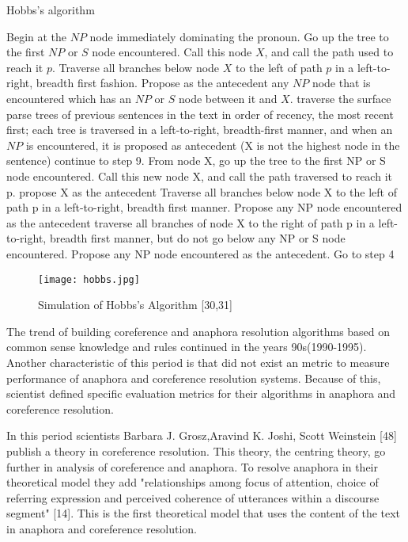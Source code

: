 \newpage
\begin{algorithm}[H]
\caption{Hobbs's algorithm}\label{alg:Hobbs}
\begin{algorithmic}[1]
\State Begin at the $NP$ node immediately dominating the pronoun.
\State Go up the tree to the first $NP$ or $S$ node encountered. Call this node $X$, and call the path used to reach it $p$.
\State Traverse all branches below node $X$ to the left of path $p$ in a left-to-right, breadth first fashion. Propose as the antecedent any $NP$ node that is encountered which has an $NP$ or $S$ node between it and $X$.
	\State traverse the surface parse trees of previous sentences in the text in order of recency, the most recent first; each tree is traversed in a left-to-right, breadth-first manner, and when an $NP$ is encountered, it is proposed as antecedent
\Else
	\State (X is not the highest node in the sentence) continue to step 9.
\EndIf
\State From node X, go up the tree to the first NP or S node encountered. Call this new node X, and call the path traversed to reach it p.
     \State propose X as the antecedent
\EndIf
\State Traverse all branches below node X to the left of path p in a left-to-right, breadth first manner. Propose any NP node encountered as the antecedent
    \State traverse all branches of node X to the right of path p in a left-to-right, breadth first manner, but do not go below any NP or S node encountered.
    \State Propose any NP node encountered as the antecedent.
\EndIf
\State Go to step 4
\end{algorithmic}
\end{algorithm}

\begin{figure}[h]
	\texttt{[image: hobbs.jpg]} 
 	\caption{Simulation of Hobbs's Algorithm [30,31] }
	\label{Figure 5}
\end{figure}

The trend of building coreference and anaphora resolution algorithms based on common sense knowledge and rules continued in the years 90s(1990-1995). Another characteristic of this period is that did not exist an metric to measure performance of anaphora and coreference resolution systems. Because of this, scientist defined specific evaluation metrics for their algorithms in anaphora and coreference resolution.

In this period scientists Barbara J. Grosz,Aravind K. Joshi, Scott Weinstein [48] publish a theory in coreference resolution. This theory, the centring theory, go further in analysis of coreference and anaphora. To resolve anaphora in their theoretical model they add "relationships among focus of attention, choice of referring expression and perceived coherence of utterances within a discourse segment" [14]. This is the first theoretical model that uses the content of the text in anaphora and coreference resolution.

